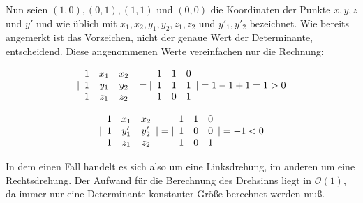 \documentclass[ngerman,draft,parskip=half*,twoside]{scrreprt}
\theoremstyle{break}
\theoremstyle{nonumberbreak}
\newcommand*{\OO}{\mathcal{O}}      %
\DeclarePairedDelimiter{\abs}{\lvert}{\rvert}
\begin{document}
Nun seien $(1,0), (0,1), (1,1)$ und $(0,0)$ die Koordinaten der Punkte $x,y,z$ und $y'$ 
und wie üblich mit $x_1, x_2, y_1, y_2, z_1, z_2$ und $y'_1, y'_2$
bezeichnet. Wie bereits angemerkt ist das Vorzeichen, nicht der genaue Wert der
Determinante, entscheidend. Diese angenommenen Werte vereinfachen nur die Rechnung:

\[ \abs{ 
\begin{array}{ccc}
1 & x_1 & x_2\\
1 & y_1 & y_2\\
1 & z_1 & z_2\\
\end{array} 
}=
\abs{ 
\begin{array}{ccc}
1 & 1 & 0\\
1 & 1 & 1\\
1 & 0 & 1\\
\end{array} 
}=1-1+1=1>0 \]

\[ \abs{ 
\begin{array}{ccc}
1 & x_1 & x_2\\
1 & y'_1 & y'_2\\
1 & z_1 & z_2\\
\end{array} 
}=
\abs{ 
\begin{array}{ccc}
1 & 1 & 0\\
1 & 0 & 0\\
1 & 0 & 1\\
\end{array} 
}=-1<0 \]

In dem einen Fall handelt es sich also um eine Linksdrehung, im anderen um eine Rechtsdrehung. Der Aufwand für die Berechnung des
Drehsinns liegt in $\OO(1)$, da immer nur eine Determinante konstanter Größe berechnet werden muß.
\end{document}
